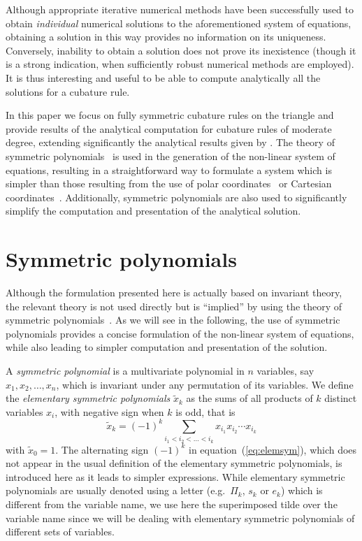 \documentclass{article}
\begin{document}
Although appropriate iterative numerical methods have been successfully used to obtain \emph{individual} numerical solutions to the aforementioned system of equations, obtaining a solution in this way provides no information on its uniqueness. Conversely, inability to obtain a solution does not prove its inexistence (though it is a strong indication, when sufficiently robust numerical methods are employed). It is thus interesting and useful to be able to compute analytically all the solutions for a cubature rule.



In this paper we focus on fully symmetric cubature rules on the triangle and provide results of the analytical computation for cubature rules of moderate degree, extending significantly the analytical results given by \citet{LynessJespersen1975}. The theory of symmetric polynomials~\citep{Macdonald1998} is used in the generation of the non-linear system of equations, resulting in a straightforward way to formulate a system which is simpler than those resulting from the use of polar coordinates~\citep{LynessJespersen1975,BerntsenEspelid1990} or Cartesian coordinates~\citep{WandzuraXiao2003}. Additionally, symmetric polynomials are also used to significantly simplify the computation and presentation of the analytical solution.





\section{Symmetric polynomials}


Although the formulation presented here is actually based on invariant theory, the relevant theory is not used directly but is ``implied'' by using the theory of symmetric polynomials~\citep{Macdonald1998}. As we will see in the following, the use of symmetric polynomials provides a concise formulation of the non-linear system of equations, while also leading to simpler computation and presentation of the solution.

A \emph{symmetric polynomial} is a multivariate polynomial in $n$ variables, say $x_1,x_2,\ldots,x_n$, which is invariant under any permutation of its variables. We define the \emph{elementary symmetric polynomials} $\tilde{x}_k$ as the sums of all products of $k$ distinct variables $x_i$, with negative sign when $k$ is odd, that is
\begin{equation}
  \label{eq:elemsym}
  \tilde{x}_k = (-1)^k \sum_{i_1<i_2<\ldots<i_k} x_{i_1} x_{i_2} \cdots x_{i_k}
\end{equation}
with $\tilde{x}_0 = 1$. The alternating sign $(-1)^k$ in equation~(\ref{eq:elemsym}), which does not appear in the usual definition of the elementary symmetric polynomials, is introduced here as it leads to simpler expressions. While elementary symmetric polynomials are usually denoted using a letter (e.g.\ $\Pi_k$, $s_k$ or $e_k$) which is different from the variable name, we use here the superimposed tilde over the variable name since we will be dealing with elementary symmetric polynomials of different sets of variables.
\end{document}
